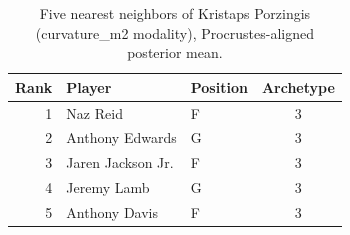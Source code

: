 \begin{table}[htbp]
  \centering\small
  \begin{tabular}{rllc}
    \toprule
    Rank & Player & Position & Archetype \\
    \midrule
    1 & Naz Reid & F & 3 \\
    2 & Anthony Edwards & G & 3 \\
    3 & Jaren Jackson Jr. & F & 3 \\
    4 & Jeremy Lamb & G & 3 \\
    5 & Anthony Davis & F & 3 \\
    \bottomrule
  \end{tabular}
  \caption{Five nearest neighbors of Kristaps Porzingis (curvature_m2 modality), Procrustes-aligned posterior mean.}
  \label{tab:Kristaps_Porzingis_neighbors_curvature_m2}
\end{table}


